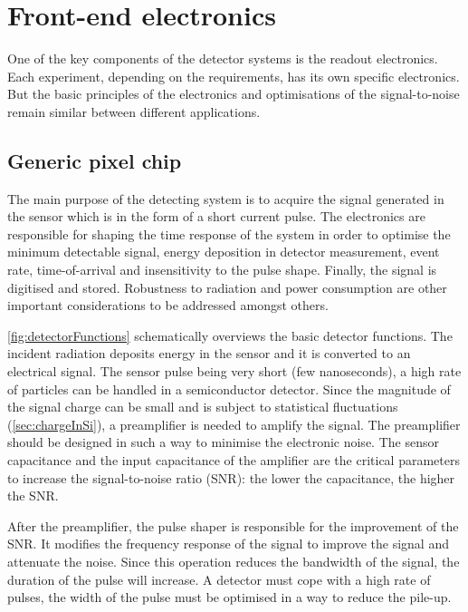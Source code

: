 \chapter{Front-end electronics}
\label{sec:FE_electronics}

One of the key components of the detector systems is the readout
electronics. Each experiment, depending on the requirements, has its
own specific electronics. But the basic principles of the electronics
and optimisations of the signal-to-noise remain similar between
different applications.

\section{Generic pixel chip}

The main purpose of the detecting system is to acquire the signal
generated in the sensor which is in the form of a short current
pulse. The electronics are responsible for shaping the time response
of the system in order to optimise the minimum detectable signal,
energy deposition in detector measurement, event rate, time-of-arrival
and insensitivity to the pulse shape. Finally, the signal is digitised
and stored. Robustness to radiation and power consumption are other
important considerations to be addressed amongst others.

\cref{fig:detectorFunctions} schematically overviews the basic
detector functions. The incident radiation deposits energy in the
sensor and it is converted to an electrical signal. The sensor pulse
being very short (few nanoseconds), a high rate of particles can be
handled in a semiconductor detector. Since the magnitude of the signal
charge can be small and is subject to statistical fluctuations
(\cref{sec:chargeInSi}), a preamplifier is needed to amplify the
signal. The preamplifier should be designed in such a way to minimise
the electronic noise. The sensor capacitance and the input capacitance
of the amplifier are the critical parameters to increase the
signal-to-noise ratio (SNR): the lower the capacitance, the higher the
SNR.

After the preamplifier, the pulse shaper is responsible for the
improvement of the SNR. It modifies the frequency response of the
signal to improve the signal and attenuate the noise. Since this
operation reduces the bandwidth of the signal, the duration of the
pulse will increase. A detector must cope with a high rate of pulses,
the width of the pulse must be optimised in a way to reduce the
pile-up.

